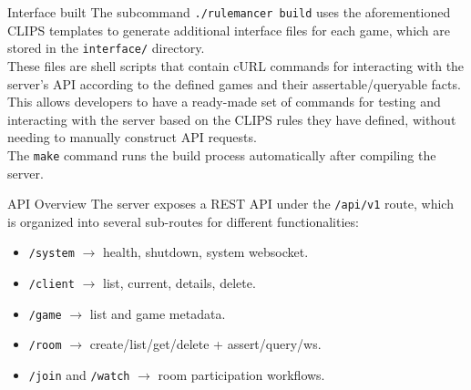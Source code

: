 \documentclass[aspectratio=169]{beamer}
\begin{document}
\begin{frame}{Interface built}
The subcommand \texttt{./rulemancer build} uses the aforementioned CLIPS templates to generate
additional interface files for each game, which are stored in the \texttt{interface/} directory. \\
\vspace{0.4cm}
These files are shell scripts that contain cURL commands for interacting with the server's API
according to the defined games and their assertable/queryable facts. \\
\vspace{0.4cm}
This allows developers to have a ready-made set of commands for testing and interacting with the server based
on the CLIPS rules they have defined, without needing to manually construct API requests. \\
\vspace{0.4cm}
The \texttt{make} command runs the build process automatically after compiling the server.
\end{frame}

\begin{frame}{API Overview}
The server exposes a REST API under the \texttt{/api/v1} route, which is organized into several sub-routes
for different functionalities:
\vspace{0.3cm}
\begin{itemize}
  \item \texttt{/system} $\rightarrow$ health, shutdown, system websocket.
  \vspace{0.3cm}
  \item \texttt{/client} $\rightarrow$ list, current, details, delete.
  \vspace{0.3cm}
  \item \texttt{/game} $\rightarrow$ list and game metadata.
  \vspace{0.3cm}
  \item \texttt{/room} $\rightarrow$ create/list/get/delete + assert/query/ws.
  \vspace{0.3cm}
  \item \texttt{/join} and \texttt{/watch} $\rightarrow$ room participation workflows.
\end{itemize}
\end{frame}
\end{document}
